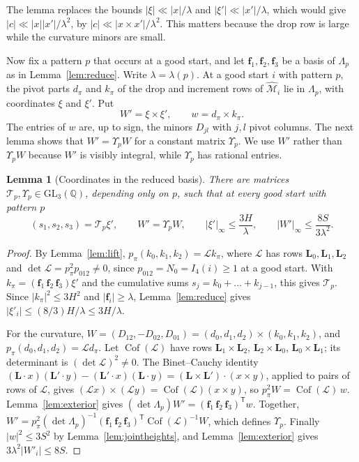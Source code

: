 \documentclass[11pt]{article}
\newtheorem{lemma}[theorem]{Lemma}
\theoremstyle{definition}
\theoremstyle{remark}
\begin{document}
The lemma replaces the bounds $|\xi|\ll|x|/\lambda$ and $|\xi'|\ll|x'|/\lambda$, which would give
$|c|\ll|x||x'|/\lambda^2$, by $|c|\ll|x\times x'|/\lambda^2$. This matters because the drop row
is large while the curvature minors are small.

Now fix a pattern $p$ that occurs at a good start, and let $\mathbf f_1,\mathbf f_2,\mathbf f_3$ be a
basis of $\Lambda_p$ as in Lemma~\ref{lem:reduce}. Write $\lambda=\lambda(p)$. At a good start
$i$ with pattern $p$, the pivot parts $d_\pi$ and $k_\pi$ of the drop and increment rows of
$\widehat{\mathcal M}_i$ lie in $\Lambda_p$, with coordinates $\xi$ and $\xi'$. Put
\[
 W'=\xi\times\xi',\qquad w=d_\pi\times k_\pi.
\]
The entries of $w$ are, up to sign, the minors $D_{jl}$ with $j,l$ pivot columns. The next lemma
shows that $W'=\Upsilon_pW$ for a constant matrix $\Upsilon_p$. We use $W'$ rather than $\Upsilon_pW$ because $W'$ is
visibly integral, while $\Upsilon_p$ has rational entries.

\begin{lemma}[Coordinates in the reduced basis]\label{lem:latticecoords}
There are matrices $\mathcal T_p,\Upsilon_p\in\mathrm{GL}_3(\mathbb Q)$, depending only on $p$, such that at
every good start with pattern $p$
\[
 (s_1,s_2,s_3)=\mathcal T_p\xi',\qquad W'=\Upsilon_pW,\qquad
 |\xi'|_\infty\le\frac{3H}{\lambda},\qquad |W'|_\infty\le\frac{8S}{3\lambda^2}.
\]
\end{lemma}

\begin{proof}
By Lemma~\ref{lem:lift}, $p_\pi(k_0,k_1,k_2)=\mathcal Lk_\pi$, where $\mathcal L$ has rows
$\mathbf L_0,\mathbf L_1,\mathbf L_2$ and $\det\mathcal L=p_\pi^2p_{012}\ne0$, since $p_{012}=N_0=I_4(i)\ge1$ at a good
start. With $k_\pi=(\mathbf f_1\,\mathbf f_2\,\mathbf f_3)\xi'$ and the cumulative sums $s_j=k_0+\dots+k_{j-1}$,
this gives $\mathcal T_p$. Since $|k_\pi|^2\le3H^2$ and $|\mathbf f_i|\ge\lambda$, Lemma~\ref{lem:reduce} gives
$|\xi'_i|\le(8/3)H/\lambda\le3H/\lambda$.

For the curvature, $W=(D_{12},-D_{02},D_{01})=(d_0,d_1,d_2)\times(k_0,k_1,k_2)$, and
$p_\pi(d_0,d_1,d_2)=\mathcal Ld_\pi$. Let $\operatorname{Cof}(\mathcal L)$ have rows
$\mathbf L_1\times \mathbf L_2$, $\mathbf L_2\times \mathbf L_0$, $\mathbf L_0\times \mathbf L_1$; its determinant is
$(\det\mathcal L)^2\ne0$. The Binet--Cauchy identity
$(\mathbf L\cdot x)(\mathbf L'\cdot y)-(\mathbf L'\cdot x)(\mathbf L\cdot y)=(\mathbf L\times\mathbf L')\cdot(x\times y)$, applied to pairs of
rows of $\mathcal L$, gives $(\mathcal Lx)\times(\mathcal Ly)=\operatorname{Cof}(\mathcal L)(x\times
y)$, so $p_\pi^2W=\operatorname{Cof}(\mathcal L)\,w$. Lemma~\ref{lem:exterior} gives
$(\det\Lambda_p)W'=(\mathbf f_1\,\mathbf f_2\,\mathbf f_3)^{\mathsf T}w$. Together,
$W'=p_\pi^2(\det\Lambda_p)^{-1}(\mathbf f_1\,\mathbf f_2\,\mathbf f_3)^{\mathsf T}\operatorname{Cof}(\mathcal L)^{-1}W$,
which defines $\Upsilon_p$. Finally $|w|^2\le3S^2$ by Lemma~\ref{lem:jointheights}, and
Lemma~\ref{lem:exterior} gives $3\lambda^2|W'_i|\le8S$.
\end{proof}
\end{document}
